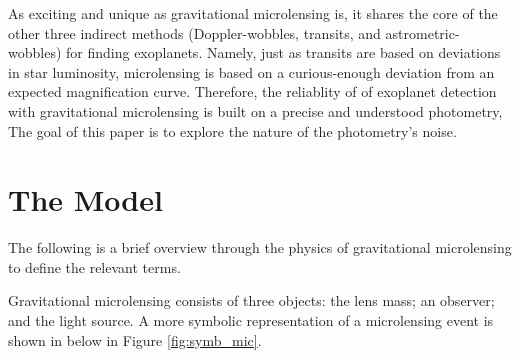 \documentclass[12pt, a4paper]{article}
\begin{document}


As exciting and unique as gravitational microlensing is, it shares the core of the other three indirect methods (Doppler-wobbles, transits, and astrometric-wobbles) for finding exoplanets.
Namely, just as transits are based on deviations in star luminosity,
microlensing is based on a curious-enough deviation from an expected magnification curve.
Therefore, the reliablity of of exoplanet detection with gravitational microlensing is built on
a precise and understood photometry,
The goal of this paper is to explore the nature of the photometry's noise.

\section{The Model}

The following is a brief overview through the physics of gravitational microlensing to define the relevant terms.

Gravitational microlensing consists of three objects: the lens mass; an observer; and the light source.
A more symbolic representation of a microlensing event is shown in below in Figure \ref{fig:symb_mic}.
\end{document}
